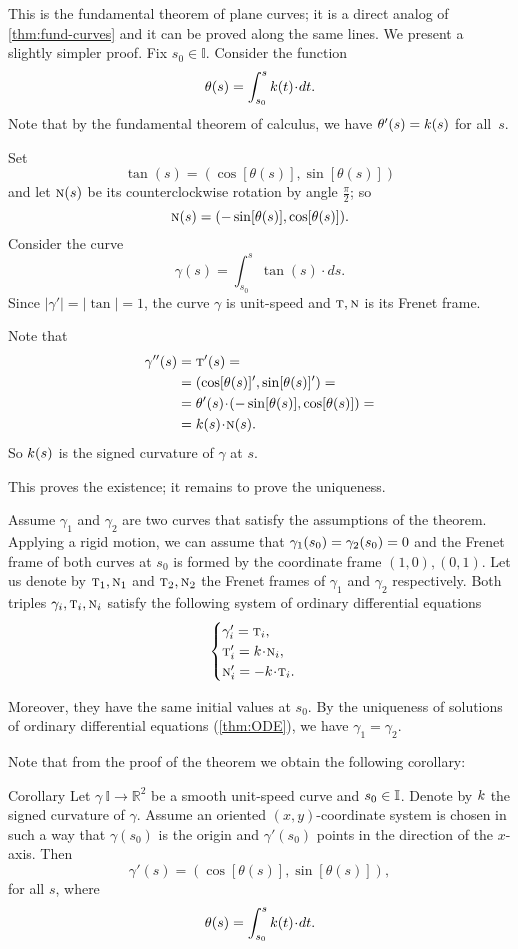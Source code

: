 This is the fundamental theorem of plane curves; it is a direct analog of \ref{thm:fund-curves} and it can be proved along the same lines.
We present a slightly simpler proof.
Fix $s_0\in\mathbb{I}$.
Consider the function
\[\theta(s)
=
\int_{s_0}^s\skur(t)\cdot dt.\]
Note that by the fundamental theorem of calculus, we have $\theta'(s)\z=\skur(s)$ for all~$s$.

Set 
\[\tan(s)=(\cos[\theta(s)],\sin[\theta(s)])\] and let $\text{\sc{n}}(s)$ be its counterclockwise rotation by angle $\tfrac\pi2$; so 
\[\text{\sc{n}}(s)=(-\sin[\theta(s)],\cos[\theta(s)]).\]
Consider the curve 
\[\gamma(s)=\int_{s_0}^s\tan(s)\cdot ds.\]
Since $|\gamma'|=|\tan|=1$, the curve $\gamma$ is unit-speed and $\text{\sc{t}},\text{\sc{n}}$ is its Frenet frame. 

Note that
\begin{align*}
\gamma''(s)&=\tan'(s)=
\\
&=(\cos[\theta(s)]',\sin[\theta(s)]')=
\\
&=\theta'(s)\cdot (-\sin[\theta(s)],\cos[\theta(s)])=
\\
&=\skur(s)\cdot \norm(s).
\end{align*}
So $k(s)$ is the signed curvature of $\gamma$ at $s$. 

This proves the existence;
it remains to prove the uniqueness.

Assume $\gamma_1$ and $\gamma_2$ are two curves that satisfy the assumptions of the theorem.
Applying a rigid motion, we can assume that $\gamma_1(s_0)\z=\gamma_2(s_0)\z=0$ and the Frenet frame of both curves at $s_0$ is formed by the coordinate frame $(1,0),(0,1)$.
Let us denote by $\text{\sc{t}}_1,\text{\sc{n}}_1$ and $\text{\sc{t}}_2,\text{\sc{n}}_2$ the Frenet frames of $\gamma_1$ and $\gamma_2$ respectively.
Both triples $\gamma_i,\text{\sc{t}}_i,\text{\sc{n}}_i$ satisfy the following system of ordinary differential equations 
\[
\begin{cases}
\gamma_i'=\tan_i,
\\
\tan_i'=\skur\cdot\norm_i,
\\
\norm_i'=-\skur\cdot\tan_i.
\end{cases}
\]

Moreover, they have the same initial values at $s_0$.
By the uniqueness of solutions of ordinary differential equations (\ref{thm:ODE}), we have $\gamma_1=\gamma_2$.
\qeds

Note that from the proof of the theorem we obtain the following corollary:



\begin{thm}{Corollary}\label{cor:2D-angle}
Let $\gamma\:\mathbb{I}\to\mathbb{R}^2$ be a smooth unit-speed curve and $s_0\z\in \mathbb{I}$.
Denote by $k$ the signed curvature of $\gamma$.
Assume an oriented $(x,y)$-coordinate system is chosen in such a way that $\gamma(s_0)$ is the origin and $\gamma'(s_0)$ points in the direction of the $x$-axis.
Then 
\[\gamma'(s)=(\cos[\theta(s)],\sin[\theta(s)]) , \]
for all $s$, where 
\[\theta(s)=\int_{s_0}^s\skur(t)\cdot dt.\]
\end{thm}


